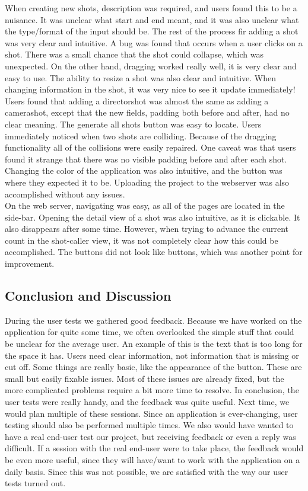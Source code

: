 When creating new shots, description was required, and users found this to be a nuisance. It was unclear what start and end meant, and it was also unclear what the type/format of the input should be. The rest of the process fir adding a shot was very clear and intuitive. A bug was found that occurs when a user clicks on a shot. There was a small chance that the shot could collapse, which was unexpected. On the other hand, dragging worked really well, it is very clear and easy to use. The ability to resize a shot was also clear and intuitive. When changing information in the shot, it was very nice to see it update immediately! Users found that adding a directorshot was almost the same as adding a camerashot, except that the new fields, padding both before and after, had no clear meaning. The generate all shots button was easy to locate. Users immediately noticed when two shots are colliding. Because of the dragging functionality all of the collisions were easily repaired. One caveat was that users found it strange that there was no visible padding before and after each shot. Changing the color of the application was also intuitive, and the button was where they expected it to be. Uploading the project to the webserver was also accomplished without any issues.\\

On the web server, navigating was easy, as all of the pages are located in the side-bar. Opening the detail view of a shot was also intuitive, as it is clickable. It also disappears after some time. However, when trying to advance the current count in the shot-caller view, it was not completely clear how this could be accomplished. The buttons did not look like buttons, which was another point for improvement.
\subsection{Conclusion and Discussion}
During the user tests we gathered good feedback. Because we have worked on the application for quite some time, we often overlooked the simple stuff that could be unclear for the average user. An example of this is the text that is too long for the space it has. Users need clear information, not information that is missing or cut off. Some things are really basic, like the appearance of the button. These are small but easily fixable issues. Most of these issues are already fixed, but the more complicated problems require a bit more time to resolve. In conclusion, the user tests were really handy, and the feedback was quite useful. Next time, we would plan multiple of these sessions. Since an application is ever-changing, user testing should also be performed multiple times. We also would have wanted to have a real end-user test our project, but receiving feedback or even a reply was difficult. If a session with the real end-user were to take place, the feedback would be even more useful, since they will have/want to work with the application on a daily basis. Since this was not possible, we are satisfied with the way our user tests turned out.
